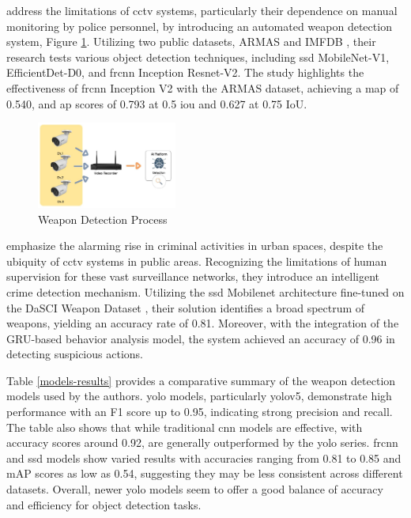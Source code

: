 \citet{rfc20} address the limitations of \ac{cctv} systems, particularly their dependence on manual monitoring by police personnel, by introducing an automated weapon detection system, Figure \ref{fig:hnoohom-system}. Utilizing two public datasets, ARMAS and IMFDB \cite{rfc28}, their research tests various object detection techniques, including \ac{ssd} MobileNet-V1, EfficientDet-D0, and \ac{frcnn} Inception Resnet-V2. The study highlights the effectiveness of \ac{frcnn} Inception V2 with the ARMAS dataset, achieving a \ac{map} of 0.540, and \ac{ap} scores of 0.793 at 0.5 \ac{iou} and 0.627 at 0.75 IoU.
\begin{figure}[h]
    \centering 
    \includegraphics[width=0.41\textwidth]{figs/hnoohom-system.png} 
    \caption{\citet{rfc20} Weapon Detection Process}
    \label{fig:hnoohom-system}
\end{figure}

\citet{rfc7} emphasize the alarming rise in criminal activities in urban spaces, despite the ubiquity of \ac{cctv} systems in public areas. Recognizing the limitations of human supervision for these vast surveillance networks, they introduce an intelligent crime detection mechanism. Utilizing the \ac{ssd} Mobilenet architecture fine-tuned on the DaSCI Weapon Dataset \cite{rfc29}, their solution identifies a broad spectrum of weapons, yielding an accuracy rate of 0.81. Moreover, with the integration of the GRU-based behavior analysis model, the system achieved an accuracy of 0.96 in detecting suspicious actions.

Table \ref{models-results} provides a comparative summary of the weapon detection models used by the authors. \ac{yolo} models, particularly \ac{yolo}v5, demonstrate high performance with an F1 score up to 0.95, indicating strong precision and recall. The table also shows that while traditional \ac{cnn} models are effective, with accuracy scores around 0.92, are generally outperformed by the \ac{yolo} series. \ac{frcnn} and \ac{ssd} models show varied results with accuracies ranging from 0.81 to 0.85 and mAP scores as low as 0.54, suggesting they may be less consistent across different datasets. Overall, newer \ac{yolo} models seem to offer a good balance of accuracy and efficiency for object detection tasks.

